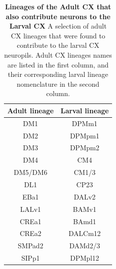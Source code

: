         \begin{table} [H]
        \centering
        \begin{tabular}{|c|c|}
        \hline
        Adult lineage & Larval lineage \\
        \hline
        DM1 & DPMm1 \\
        DM2 & DPMpm1 \\
        DM3 & DPMpm2 \\
        DM4 & CM4 \\
        DM5/DM6 & CM1/3 \\
        DL1 & CP23 \\
        EBa1 & DALv2 \\
        LALv1 & BAMv1 \\
        CREa1 & BAmd1 \\
        CREa2 & DALCm12 \\
        SMPad2 & DAMd2/3 \\
        SIPp1 & DPMpl12 \\
        \bottomrule
        \end{tabular}
        \caption[Lineages of the Adult CX that also contribute neurons to the Larval CX]{\textbf{Lineages of the Adult CX that also contribute neurons to the Larval CX} A selection of adult CX lineages that were found to contribute to the larval CX neuropils.  Adult CX lineages names are listed in the first column, and their corresponding larval lineage nomenclature in the second column\citep{eckstein2024neurotransmitter}.}
        \label{lineagemap}
        \end{table}
